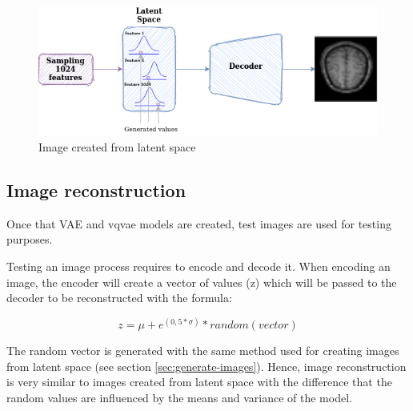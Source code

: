 \begin{figure}[ht]
    \centering
    \includegraphics[width = 14cm]{images/tfm-vae-latent-space.png}
    \caption[Image created from latent space]{Image created from latent space}
    \label{fig:image-from-latent-space-diagram}
\end{figure}

\subsection{Image reconstruction}

Once that VAE and \acrshort{vqvae} models are created, test images are used for testing purposes.

Testing an image process requires to encode and decode it. When encoding an image, the encoder will create a vector of values (z) which will be passed to the decoder to be reconstructed with the formula:

\begin{equation}
    z = \mu  + e^{(0,5 * \sigma)} * random(vector)
\end{equation}

The random vector is generated with the same method used for creating images from latent space (see section \ref{sec:generate-images}). Hence, image reconstruction is very similar to images created from latent space with the difference that the random values are influenced by the means and variance of the model.